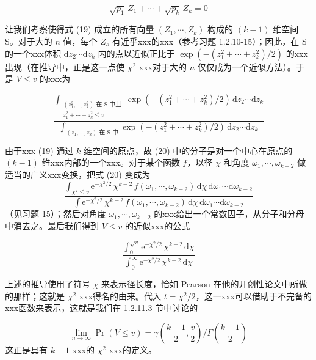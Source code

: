\begin{equation}
\sqrt{p_1}\,Z_1 + \cdots + \sqrt{p_k}\,Z_k = 0 \tag{19}
\end{equation}

让我们考察使得式 (19) 成立的所有向量 $(Z_1, \cdots, Z_k)$ 构成的 $(k-1)$ 维空间 S。对于大的 $n$ 值，每个 $Z_s$ 有近乎xxx的xxx（参考习题 1.2.10-15）；因此，在 S 的一个xxx体积 $\mathrm{d}z_2 \cdots \mathrm{d}z_k$ 内的点以近似正比于 $\exp(-(z_1^2 + \cdots + z_k^2)/2)$ 的xxx出现（在推导中，正是这一点使 $\chi^2$ xxx对于大的 $n$ 仅仅成为一个近似方法）。于是 $V \leqslant v$ 的xxx为

\begin{equation}
\frac{\displaystyle\int_{\substack{(z_1^2, \cdots, z_k^2) \text{ 在 S 中且} \\ z_1^2 + \cdots + z_k^2 \leqslant v}} \exp(-(z_1^2 + \cdots + z_k^2)/2)\,\mathrm{d}z_2 \cdots \mathrm{d}z_k}{\displaystyle\int_{(z_1, \cdots, z_k) \text{ 在 S 中}} \exp(-(z_1^2 + \cdots + z_k^2)/2)\,\mathrm{d}z_2 \cdots \mathrm{d}z_k} \tag{20}
\end{equation}

由于xxx (19) 通过 $k$ 维空间的原点，故 (20) 中的分子是对一个中心在原点的 $(k-1)$ 维xxx内部的一个xxx。对于某个函数 $f$，以径 $\chi$ 和角度 $\omega_1, \cdots, \omega_{k-2}$ 做适当的广义xxx变换，把式 (20) 变成为
\[
\frac{\displaystyle\int_{\chi^2 \leqslant v} \mathrm{e}^{-\chi^2/2}\,\chi^{k-2}\,f(\omega_1, \cdots, \omega_{k-2})\,\mathrm{d}\chi\,\mathrm{d}\omega_1 \cdots \mathrm{d}\omega_{k-2}}{\displaystyle\int \mathrm{e}^{-\chi^2/2}\,\chi^{k-2}\,f(\omega_1, \cdots, \omega_{k-2})\,\mathrm{d}\chi\,\mathrm{d}\omega_1 \cdots \mathrm{d}\omega_{k-2}}
\]
（见习题 15）；然后对角度 $\omega_1, \cdots, \omega_{k-2}$ 的xxx给出一个常数因子，从分子和分母中消去之。最后我们得到 $V \leqslant v$ 的近似xxx的公式

\begin{equation}
\frac{\displaystyle\int_0^{\sqrt{v}} \mathrm{e}^{-\chi^2/2}\,\chi^{k-2}\,\mathrm{d}\chi}{\displaystyle\int_0^{\infty} \mathrm{e}^{-\chi^2/2}\,\chi^{k-2}\,\mathrm{d}\chi} \tag{21}
\end{equation}

上述的推导使用了符号 $\chi$ 来表示径长度，恰如 Pearson 在他的开创性论文中所做的那样；这就是 $\chi^2$ xxx得名的由来。代入 $t = \chi^2/2$，这一xxx可以借助于不完备的xxx函数来表示，这就是我们在 1.2.11.3 节中讨论的

\begin{equation}
\lim_{n \to \infty} \Pr(V \leqslant v) = \gamma\!\left(\frac{k-1}{2}, \frac{v}{2}\right) \bigg/ \Gamma\!\left(\frac{k-1}{2}\right) \tag{22}
\end{equation}
这正是具有 $k-1$ xxx的 $\chi^2$ xxx的定义。

